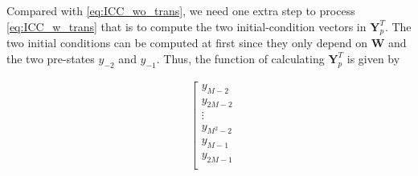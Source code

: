 Compared with \eqref{eq:ICC_wo_trans}, we need one extra step to process \eqref{eq:ICC_w_trans} 
that is to compute the two initial-condition vectors in $\bm{Y}_p^T$. The two initial conditions
can be computed at first since they only depend on $\bm{W}$ and the two pre-states $y_{-2}$ and $y_{-1}$.
Thus, the function of calculating $\bm{Y}_p^T$ is given by

\begin{equation}
    \label{eq:ICC_init_w_trans}
    \begin{aligned}
        &\left[\begin{array}{c}
            y_{M-2}  \\ 
            y_{2M-2}  \\
            \vdots \\
            y_{M^2-2} \\ \hline 
            y_{M-1}  \\ 
            y_{2M-1}  \\

\end{array}
\end{aligned}
\end{equation}
